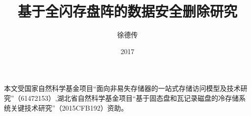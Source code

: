 \documentclass[format=draft,degree=master,language=chinese]{hustthesis}
\title{基于全闪存盘阵的数据安全删除研究}{Research of Secure Deletion based on
  Solid-State Disk Array}
\author{徐德传}{Dechuan Xu}
\date{2017}{5}{27}
\begin{document}
\frontmatter
\maketitle
\makeabstract
\tableofcontents
\listoffigures
\listoftables
\mainmatter






%


\backmatter

\begin{ack}
    本文受国家自然科学基金项目“面向非易失存储器的一站式存储访问模型及技术研究”（61472153）,湖北省自然科学基金项目“基于固态盘和瓦记录磁盘的冷存储系统关键技术研究”（2015CFB192）资助。
\end{ack}



\end{document}
